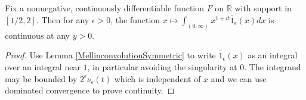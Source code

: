 \begin{lemma}
\label{Smooth1ContinuousAt}
\leanok
Fix a nonnegative, continuously differentiable function $F$ on $\mathbb{R}$ with support in
  $[1/2,2]$. Then for any $\epsilon>0$, the function
  $x \mapsto \int_{(0,\infty)} x^{1+it} \widetilde{1_{\epsilon}}(x) dx$ is continuous at any $y>0$.
\end{lemma}
\begin{proof}
\leanok
Use Lemma \ref{MellinconvolutionSymmetric} to write $\widetilde{1_{\epsilon}}(x)$ as an integral
  over an integral near $1$, in particular avoiding the singularity at $0$. The integrand may be
  bounded by $2^{\epsilon}\nu_\epsilon(t)$ which is independent of $x$ and we can use dominated
  convergence to prove continuity.
\end{proof}
